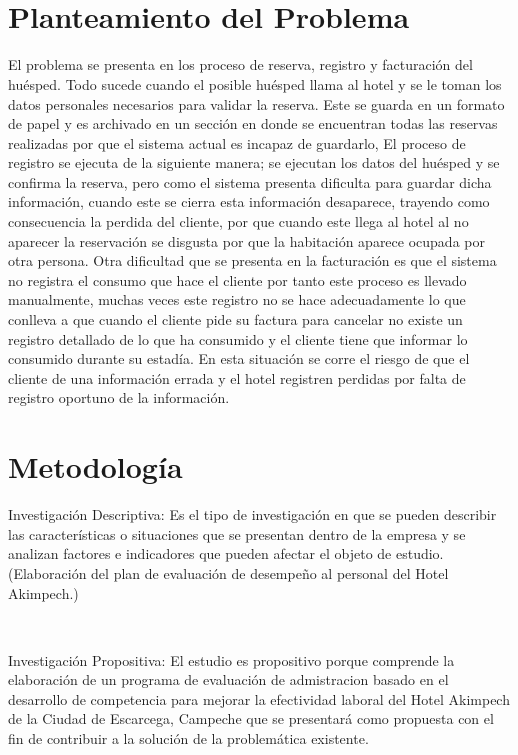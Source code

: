 \documentclass[a4paper,10pt]{report}
\begin{document}
\

\

\section{Planteamiento del Problema}

El problema se presenta en los proceso de reserva, registro y facturación del huésped. Todo sucede cuando el posible huésped llama al hotel y se le toman los datos personales necesarios para validar la reserva. Este se guarda en un formato de papel y es archivado en un sección en donde se encuentran todas las reservas realizadas por que el sistema actual es incapaz de guardarlo, El proceso de registro se ejecuta de la siguiente manera; se ejecutan los datos del huésped y se confirma la reserva, pero como el sistema presenta dificulta para guardar dicha información, cuando este se cierra esta información desaparece, trayendo como consecuencia la perdida del cliente, por que cuando este llega al hotel al no aparecer la reservación se disgusta por que la habitación aparece ocupada por otra persona. Otra dificultad que se presenta en la facturación es que el sistema no registra el consumo que hace el cliente por tanto este proceso es llevado manualmente, muchas veces este registro no se hace adecuadamente lo que conlleva a que cuando el cliente pide su factura para cancelar no existe un registro detallado de lo que ha consumido y el cliente tiene que informar lo consumido durante su estadía. En esta situación se corre el riesgo de que el cliente de una información errada y el hotel registren perdidas por falta de registro oportuno de la información.


\section{Metodología}
Investigación Descriptiva: Es el tipo de investigación en que se pueden describir las características o situaciones que se presentan dentro de la empresa y se analizan factores e indicadores que pueden afectar el objeto de estudio. (Elaboración del plan de evaluación de desempeño al personal del Hotel Akimpech.) 

\

Investigación Propositiva: El estudio es propositivo porque comprende la elaboración de un programa de evaluación de admistracion basado en el desarrollo de competencia para mejorar la efectividad laboral del Hotel Akimpech de la Ciudad de Escarcega, Campeche que se presentará como propuesta con el fin de contribuir a la solución de la problemática existente.
\end{document}
